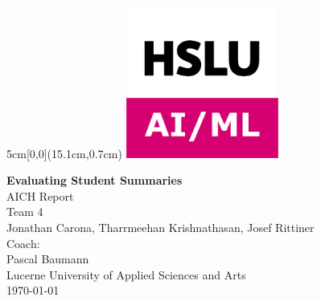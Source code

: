 \begin{titlepage}
	\begin{textblock*}{5cm}[0,0](15.1cm,0.7cm)
		\includegraphics[keepaspectratio,width=5cm]{img/HSLU-AIML.png}
	\end{textblock*}
	\begin{center}
		\vspace*{5cm}
		\Huge{\textbf{Evaluating Student Summaries}} \\
		\vspace{0.5em}
		\Large{AICH Report}\\
		\vspace{3em}
		\LARGE{Team 4}\\
		\vspace{1em}
		\Large{Jonathan Carona, Tharrmeehan Krishnathasan, Josef Rittiner}\\
		\vspace{1em}
		\Large{Coach: }\\
		Pascal Baumann\\
		\vfill
		\large{Lucerne University of Applied Sciences and Arts}\\
		\large{\today}
	\end{center}
\end{titlepage}
